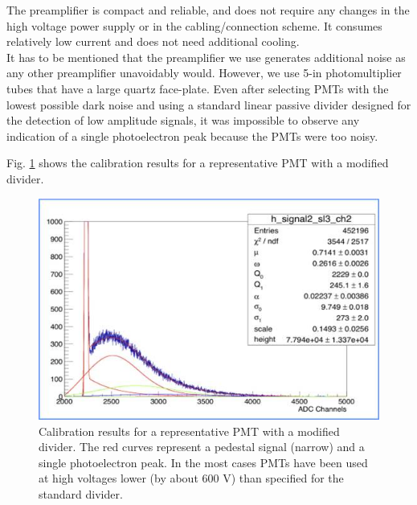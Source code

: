 The preamplifier is compact and reliable, and does not require any changes in the high voltage power supply or in the cabling/connection scheme. It consumes relatively low current and does not need additional cooling. \\
\indent It has to be mentioned that the preamplifier we use generates  additional noise as any other preamplifier unavoidably would. However, we use 5-in photomultiplier tubes that have a large quartz face-plate. Even after selecting PMTs with the lowest possible dark noise and using a standard linear passive divider designed for the detection of low amplitude signals, it was impossible to observe any indication of a single photoelectron peak because the PMTs were too noisy. 

 Fig. \ref{fig:POPOV_4} shows the calibration results for a representative PMT with a modified divider.   

 \begin{figure}[!ht]
    \centering
    \includegraphics[width=1.0\linewidth,trim={0.0cm 0.0cm 0.0cm 0.0cm},clip]{images/POPOV_4.jpg}
    \caption{Calibration results for a representative PMT with a modified divider. The red curves represent a pedestal signal (narrow) and a single photoelectron peak. In the most cases PMTs have been used at high voltages lower (by about 600 V) than specified for the standard divider.}
    \label{fig:POPOV_4}
\end{figure}

